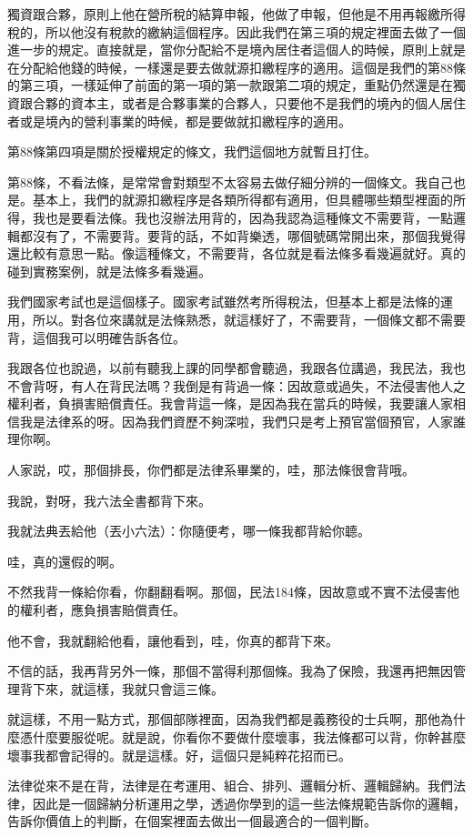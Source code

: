 \documentclass[]{ctexbook}
\begin{document}
獨資跟合夥，原則上他在營所稅的結算申報，他做了申報，但他是不用再報繳所得稅的，所以他沒有稅款的繳納這個程序。因此我們在第三項的規定裡面去做了一個進一步的規定。直接就是，當你分配給不是境內居住者這個人的時候，原則上就是在分配給他錢的時候，一樣還是要去做就源扣繳程序的適用。這個是我們的第88條的第三項，一樣延伸了前面的第一項的第一款跟第二項的規定，重點仍然還是在獨資跟合夥的資本主，或者是合夥事業的合夥人，只要他不是我們的境內的個人居住者或是境內的營利事業的時候，都是要做就扣繳程序的適用。

第88條第四項是關於授權規定的條文，我們這個地方就暫且打住。

第88條，不看法條，是常常會對類型不太容易去做仔細分辨的一個條文。我自己也是。基本上，我們的就源扣繳程序是各類所得都有適用，但具體哪些類型裡面的所得，我也是要看法條。我也沒辦法用背的，因為我認為這種條文不需要背，一點邏輯都沒有了，不需要背。要背的話，不如背樂透，哪個號碼常開出來，那個我覺得還比較有意思一點。像這種條文，不需要背，各位就是看法條多看幾遍就好。真的碰到實務案例，就是法條多看幾遍。

我們國家考試也是這個樣子。國家考試雖然考所得稅法，但基本上都是法條的運用，所以。對各位來講就是法條熟悉，就這樣好了，不需要背，一個條文都不需要背，這個我可以明確告訴各位。

我跟各位也說過，以前有聽我上課的同學都會聽過，我跟各位講過，我民法，我也不會背呀，有人在背民法嗎？我倒是有背過一條：因故意或過失，不法侵害他人之權利者，負損害賠償責任。我會背這一條，是因為我在當兵的時候，我要讓人家相信我是法律系的呀。因為我們資歷不夠深啦，我們只是考上預官當個預官，人家誰理你啊。

人家説，哎，那個排長，你們都是法律系畢業的，哇，那法條很會背哦。

我說，對呀，我六法全書都背下來。

我就法典丟給他（丟小六法）：你隨便考，哪一條我都背給你聼。

哇，真的還假的啊。

不然我背一條給你看，你翻翻看啊。那個，民法184條，因故意或不實不法侵害他的權利者，應負損害賠償責任。

他不會，我就翻給他看，讓他看到，哇，你真的都背下來。

不信的話，我再背另外一條，那個不當得利那個條。我為了保險，我還再把無因管理背下來，就這樣，我就只會這三條。

就這樣，不用一點方式，那個部隊裡面，因為我們都是義務役的士兵啊，那他為什麼憑什麼要服從呢。就是說，你看你不要做什麼壞事，我法條都可以背，你幹甚麼壞事我都會記得的。就是這樣。好，這個只是純粹花招而已。

法律從來不是在背，法律是在考運用、組合、排列、邏輯分析、邏輯歸納。我們法律，因此是一個歸納分析運用之學，透過你學到的這一些法條規範告訴你的邏輯，告訴你價值上的判斷，在個案裡面去做出一個最適合的一個判斷。
\end{document}
